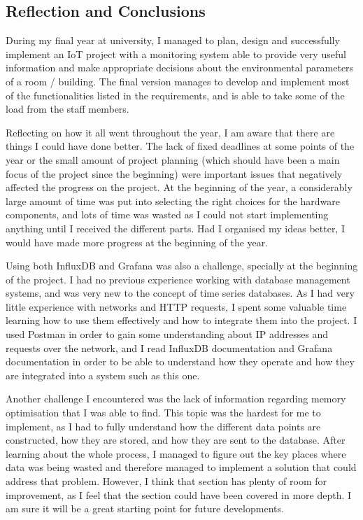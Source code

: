 \documentclass[12pt]{article}
\begin{document}
\subsection{Reflection and Conclusions}

During my final year at university, I managed to plan, design and successfully implement an IoT project with a monitoring system able to provide very useful information and make appropriate decisions about the environmental parameters of a room / building. The final version manages to develop and implement most of the functionalities listed in the requirements, and is able to take some of the load from the staff members.\par 

Reflecting on how it all went throughout the year, I am aware that there are things I could have done better. The lack of fixed deadlines at some points of the year or the small amount of project planning (which should have been a main focus of the project since the beginning) were important issues that negatively affected the progress on the project. At the beginning of the year, a considerably large amount of time was put into selecting the right choices for the hardware components, and lots of time was wasted as I could not start implementing anything until I received the different parts. Had I organised my ideas better, I would have made more progress at the beginning of the year.\par

Using both InfluxDB and Grafana was also a challenge, specially at the beginning of the project. I had no previous experience working with database management systems, and was very new to the concept of time series databases. As I had very little experience with networks and HTTP requests, I spent some valuable time learning how to use them effectively and how to integrate them into the project. I used Postman in order to gain some understanding about IP addresses and requests over the network, and I read InfluxDB documentation and Grafana documentation in order to be able to understand how they operate and how they are integrated into a system such as this one.\par

Another challenge I encountered was the lack of information regarding memory optimisation that I was able to find. This topic was the hardest for me to implement, as I had to fully understand how the different data points are constructed, how they are stored, and how they are sent to the database. After learning about the whole process, I managed to figure out the key places where data was being wasted and therefore managed to implement a solution that could address that problem. However, I think that section has plenty of room for improvement, as I feel that the section could have been covered in more depth. I am sure it will be a great starting point for future developments.\par  
\end{document}
